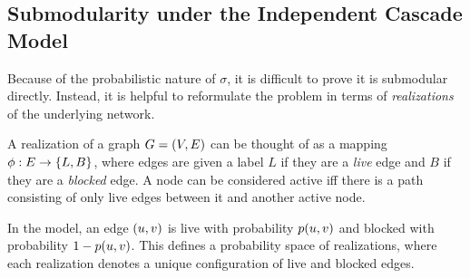 \subsection{Submodularity under the Independent Cascade Model}
Because of the probabilistic nature of $\sigma$, it is difficult to prove it is submodular directly. Instead, it is helpful to reformulate the problem in terms of \emph{realizations} of the underlying network.

\begin{definition}[Realization]
    A realization of a graph $G = \left( V, E \right)$ can be thought of as a mapping $\phi : E 
    \rightarrow \left\{ L, B \right\}$, where edges are given a label $L$ if they are a \emph{live} edge and $B$ if they are a \emph{blocked} edge. A node can be considered active iff there is a path consisting of only live edges between it and another active node. 
    \label{def:realization}
\end{definition}

In the \icmodel{} model, an edge $\left( u, v \right)$ is live with probability $p \! \left( u,v \right)$ and blocked with probability $1 - p \! \left( u,v \right)$. This defines a probability space of realizations, where each realization denotes a unique configuration of live and blocked edges. 

